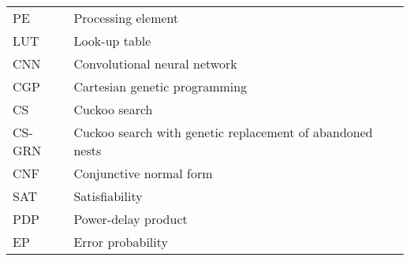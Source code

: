 \begin{table}[h!]
\begin{tabular}{ll}
      PE                &           Processing element\\
      LUT               &           Look-up table\\
      CNN               &           Convolutional neural network\\
      CGP               &           Cartesian genetic programming\\
      CS                &           Cuckoo search\\
      CS-GRN            &           Cuckoo search with genetic replacement of abandoned nests\\
      CNF               &           Conjunctive normal form\\
      SAT               &           Satisfiability\\
      PDP               &           Power-delay product\\
      EP                &           Error probability\\

    \end{tabular}
\end{table}
\pagebreak



\renewcommand*\listfigurename{\centering LIST OF FIGURES}
\listoffigures
\begingroup
\pagestyle{plain}%
\cleardoublepage
\endgroup
\pagebreak



\renewcommand*\listtablename{\centering LIST OF TABLES}
\listoftables



